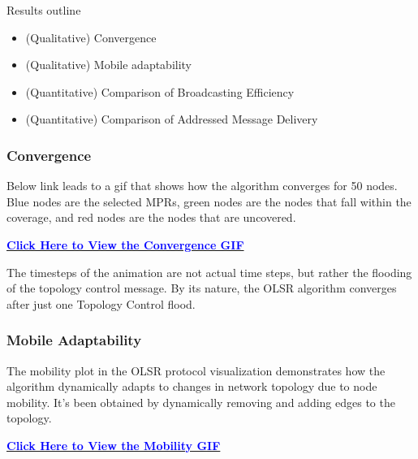 \documentclass[11pt]{beamer}              %
\begin{document}
\begin{frame}{Results outline}

\begin{itemize}
    \item (Qualitative) Convergence
    \item (Qualitative) Mobile adaptability
    \item (Quantitative) Comparison of Broadcasting Efficiency
    \item (Quantitative) Comparison of Addressed Message Delivery
\end{itemize}
    
\end{frame}

\begin{frame}
\frametitle{Convergence}

Below link leads to a gif that shows how the algorithm converges for 50 nodes. Blue nodes are the selected MPRs, green nodes are the nodes that fall within the coverage, and red nodes are the nodes that are uncovered.

\bigskip %

{\Large \href{https://s12.gifyu.com/images/SaIb0.gif}{\textbf{\textcolor{blue}{Click Here to View the Convergence GIF}}}}

\bigskip %

The timesteps of the animation are not actual time steps, but rather the flooding of the topology control message. By its nature, the OLSR algorithm converges after just one Topology Control flood.

\end{frame}

\begin{frame}
\frametitle{Mobile Adaptability}

The mobility plot in the OLSR protocol visualization demonstrates how the algorithm dynamically adapts to changes in network topology due to node mobility.  It's been obtained by dynamically removing and adding edges to the topology.

\bigskip %

{\Large \href{https://s12.gifyu.com/images/SaIbC.gif}{\textbf{\textcolor{blue}{Click Here to View the Mobility GIF}}}}

\end{frame}
\end{document}
